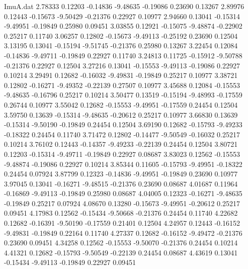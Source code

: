 \begin{filecontents}{ImuA.dat}
   2.78333    0.12203   -0.14836   -9.48635   -0.19086    0.23690    0.13267
   2.89976    0.12443   -0.15673   -9.50429   -0.21376    0.22927    0.10977
   2.94660    0.13041   -0.15314   -9.49951   -0.19849    0.25980    0.09451
   3.03855    0.12921   -0.15075   -9.48874   -0.22902    0.25217    0.11740
   3.06257    0.12802   -0.15673   -9.49113   -0.25192    0.23690    0.12504
   3.13195    0.13041   -0.15194   -9.51745   -0.21376    0.25980    0.13267
   3.22454    0.12084   -0.14836   -9.49711   -0.19849    0.22927    0.11740
   3.24813    0.11725   -0.15912   -9.50788   -0.21376    0.22927    0.12504
   3.27216    0.13041   -0.15553   -9.49113   -0.19086    0.22927    0.10214
   3.29491    0.12682   -0.16032   -9.49831   -0.19849    0.25217    0.10977
   3.38721    0.12802   -0.16271   -9.49352   -0.22139    0.27507    0.10977
   3.45688    0.12084   -0.15553   -9.48635   -0.16796    0.25217    0.10214
   3.50477    0.13519   -0.15194   -9.48993   -0.17559    0.26744    0.10977
   3.55042    0.12682   -0.15553   -9.49951   -0.17559    0.24454    0.12504
   3.59750    0.13639   -0.15314   -9.48635   -0.20612    0.25217    0.10977
   3.66830    0.13639   -0.15314   -9.50190   -0.19849    0.24454    0.12504
   3.69190    0.12682   -0.15793   -9.49233   -0.18322    0.24454    0.11740
   3.71472    0.12802   -0.14477   -9.50549   -0.16032    0.25217    0.10214
   3.76102    0.12443   -0.14357   -9.49233   -0.22139    0.24454    0.12504
   3.80721    0.12203   -0.15314   -9.49711   -0.19849    0.22927    0.08687
   3.83023    0.12562   -0.15553   -9.48874   -0.19086    0.22927    0.10214
   3.85344    0.11605   -0.15793   -9.49951   -0.18322    0.24454    0.07924
   3.87799    0.12323   -0.14836   -9.49951   -0.19849    0.23690    0.10977
   3.97045    0.13041   -0.16271   -9.48515   -0.21376    0.23690    0.08687
   4.01687    0.11964   -0.16869   -9.49113   -0.19849    0.25980    0.08687
   4.04005    0.12323   -0.16271   -9.48635   -0.19849    0.25217    0.07924
   4.08670    0.13280   -0.15673   -9.49951   -0.20612    0.25217    0.09451
   4.17983    0.12562   -0.15434   -9.50668   -0.21376    0.24454    0.11740
   4.22682    0.12682   -0.16391   -9.50190   -0.17559    0.21401    0.12504
   4.24957    0.12443   -0.16152   -9.49831   -0.19849    0.22164    0.11740
   4.27337    0.12682   -0.16152   -9.49472   -0.21376    0.23690    0.09451
   4.34258    0.12562   -0.15553   -9.50070   -0.21376    0.24454    0.10214
   4.41321    0.12682   -0.15793   -9.50549   -0.22139    0.24454    0.08687
   4.43619    0.13041   -0.15434   -9.49113   -0.19849    0.22927    0.09451

\end{filecontents}
